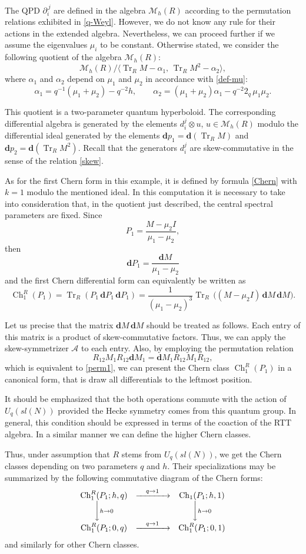 \documentclass[11pt]{article}
\newcommand{\pa}{\partial}
\DeclareMathOperator{\Tr}{Tr}
\newcommand{\ot}{\otimes}
\newcommand{\al}{\alpha}
\newcommand{\AAA}{\mathcal{A}}
\newcommand{\Aqh}{\mathcal{M}_{h}(R)}
\newcommand{\dd}{\mathbf{d}}
\DeclareMathOperator{\Ch}{Ch}
\numberwithin{equation}{section}
\theoremstyle{plain}
\theoremstyle{definition}
\begin{document}
The QPD $\pa_i^{\,j}$ are defined in the algebra $\Aqh$ according to the permutation relations exhibited in \eqref{q-Weyl}. 
However, we do not know any rule for their actions in the extended algebra. 
Nevertheless, we can proceed further if we assume the eigenvalues $\mu_i$ to be constant.
Otherwise stated, we consider the following quotient of the algebra $\Aqh$:
\[
{\Aqh}/\langle \Tr_R M-\al_1,\,\Tr_R M^2-\al_2\rangle,
\]
where $\al_1$ and $\al_2$ depend on $\mu_1$ and $\mu_2$ in accordance with \eqref{def-mu}:
\[
\al_1=q^{-1}(\mu_1+\mu_2)-q^{-2}h,
\qquad
\al_2=(\mu_1+\mu_2)\al_1-q^{-2}2_q\,\mu_1\mu_2.
\]

This quotient is a two-parameter quantum hyperboloid. The corresponding differential algebra is generated by the elements
$d_i^j\ot u$, $u\in \Aqh$ modulo the differential ideal generated by the elements $\dd p_1=\dd(\Tr_R M)$ and
$\dd p_2 = \dd(\Tr_R M^2)$. Recall that the generators $d_i^j$ are skew-commutative in the sense of the relation \eqref{skew}.

As for the first Chern form in this example, it is defined by formula \eqref{Chern} with $k=1$ modulo the mentioned ideal. In this
computation it is necessary to take into consideration that, in the quotient just described, the central spectral parameters are fixed.
Since
\[
P_1=\frac{M-\mu_2 I}{\mu_1-\mu_2},
\]
then
\[
\dd P_1=\frac{\dd M}{\mu_1-\mu_2}
\]
and the first Chern differential form can equivalently be written as
\[
\Ch^R_1(P_1)=\Tr_R(P_1\,\dd P_1\,\dd P_1)
=\frac{1}{(\mu_1-\mu_2)^3}
\Tr_R\,\bigl((M-\mu_2 I)\,\dd M\,\dd M\bigr).
\]

Let us precise that the matrix $\dd M\,\dd M$ should be treated as follows. Each entry of this matrix is a product of
skew-commutative factors. Thus, we can apply the skew-symmetrizer $\AAA$  to each entry. Also, by employing the
permutation relation
\[
R_{12}M_1R_{12}\dd M_1=\dd M_1 R_{12}M_1R_{12},
\]
which is equivalent to \eqref{perm1}, we can present the Chern class $\Ch^R_1(P_1)$ in a canonical form, that is
draw all differentials to the leftmost position.

It should be emphasized that the both operations commute with the action of $U_q(sl(N))$ provided the Hecke symmetry comes
from this quantum group. In general, this condition should be expressed in terms of the coaction of the RTT algebra.
In a similar manner we can define the higher Chern classes.

Thus, under assumption that $R$ stems from $U_q(sl(N))$, we get the Chern classes depending on two parameters $q$ and $h$.
Their specializations may be summarized by the following commutative diagram of the Chern forms:
\[
\begin{array}{ccc}
	\operatorname{Ch}^R_1(P_1;h,q) & \xrightarrow{\quad q\to1\quad} &
	\operatorname{Ch}_1(P_1;h,1) \\
	\bigg\downarrow {\scriptstyle h\to 0} && \bigg\downarrow {\scriptstyle h\to 0} \\
	\operatorname{Ch}^R_1(P_1;0,q) & \xrightarrow{\quad q\to 1\quad} &
		\operatorname{Ch}^R_1(P_1;0,1)
\end{array}
\]
and similarly for other Chern classes.
\end{document}
